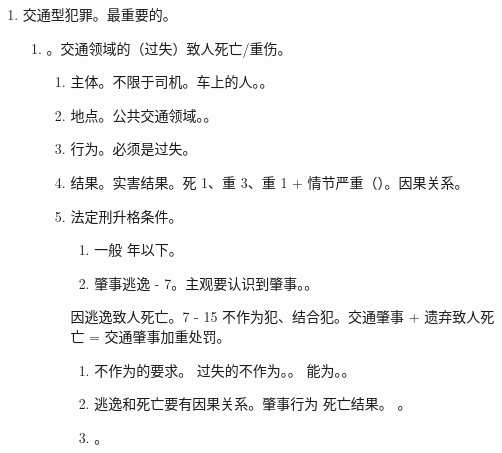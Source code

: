 \begin{enumerate}
\begin{enumerate}
          \item 破坏交通设施。物理 + 效用/功能用途丧失。
        \end{enumerate}
  \item 交通型犯罪。最重要的。
        \begin{enumerate}
          \item {}。交通领域的（过失）致人死亡/重伤。
                \begin{enumerate}
                  \item 主体。不限于司机。车上的人。。
                  \item 地点。公共交通领域。。
                  \item 行为。必须是过失。
                  \item 结果。\yi 实害结果。死 1、重 3、重 1 + 情节严重（）。\er 因果关系。
                  \item 法定刑升格条件。
                        \begin{enumerate}
                          \item 一般  年以下。
                          \item 肇事逃逸  - 7。主观要认识到肇事。。
                        \end{enumerate}
                        \begin{kk}{因逃逸致人死亡。7 - 15}
                          不作为犯、结合犯。交通肇事 + 遗弃致人死亡 = 交通肇事加重处罚。
                          \begin{enumerate}
                            \item 不作为的要求。
                                  \yi 过失的不作为。。
                                  \er 能为。。
                            \item 逃逸和死亡要有因果关系。肇事行为 \yjt {} \yjt 死亡结果。
                                  。
                            \item {}。
                          \end{enumerate}
                        \end{kk}

\end{enumerate}
\end{enumerate}
\end{enumerate}
